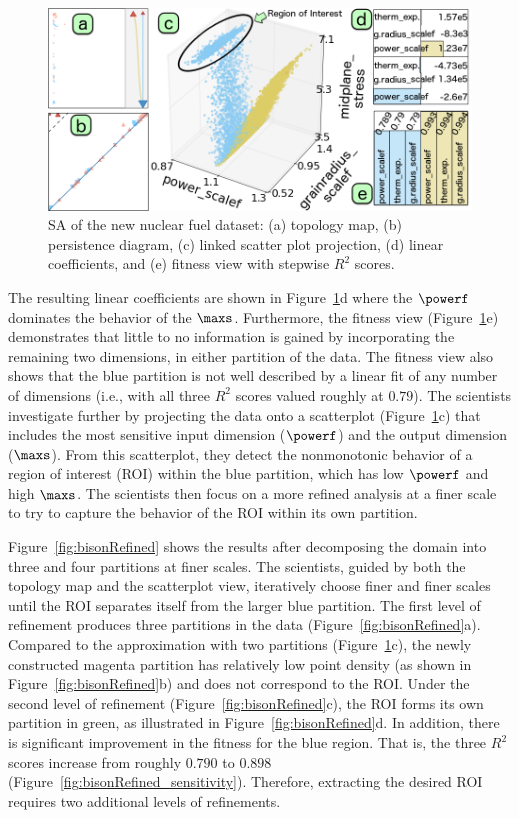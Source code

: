 \begin{figure}[!h]
  \centering
  \includegraphics[width=.48\textwidth]{figs/chap6/bison2}
  \caption{SA of the new nuclear fuel dataset:
  (a) topology map, (b) persistence diagram, (c) linked scatter plot projection,  (d) linear coefficients, and (e) fitness view with stepwise $R^2$ scores.
  }
  \label{fig:bison}
\end{figure}

The resulting linear coefficients are shown in Figure~\ref{fig:bison}d where the $\powerf$ dominates the behavior of the $\maxs$.
%
Furthermore, the fitness view (Figure~\ref{fig:bison}e) demonstrates that little to no information is gained by incorporating the remaining two dimensions, in either partition of the data.
%
The fitness view also shows that the blue partition is not well described by a linear fit of any number of dimensions (i.e., with all three $R^2$ scores valued roughly at $0.79$).
%
The scientists investigate further by projecting the data onto a scatterplot (Figure~\ref{fig:bison}c) that includes the most sensitive input dimension ($\powerf$) and the output dimension ($\maxs$).
%
From this scatterplot, they detect the nonmonotonic behavior of a region of interest (ROI) within the blue partition, which has low $\powerf$ and high $\maxs$.
%
The scientists then focus on a more refined analysis at a finer scale to try to capture the behavior of the ROI within its own partition.

Figure~\ref{fig:bisonRefined} shows the results after decomposing the domain into three and four partitions at finer scales.
%
The scientists, guided by both the topology map and the scatterplot view, iteratively choose finer and finer scales until the ROI separates itself from the larger blue partition.
%
The first level of refinement produces three partitions in the data (Figure~\ref{fig:bisonRefined}a).
%
Compared to the approximation with two partitions (Figure~\ref{fig:bison}c), the newly constructed magenta partition has relatively low point density (as shown in Figure~\ref{fig:bisonRefined}b) and does not correspond to the ROI.
%
Under the second level of refinement (Figure~\ref{fig:bisonRefined}c), the ROI forms its own partition in green, as illustrated in Figure~\ref{fig:bisonRefined}d.
%
In addition, there is significant improvement in the fitness for the blue region.
%
That is, the three $R^2$ scores increase from roughly $0.790$ to $0.898$ (Figure~\ref{fig:bisonRefined_sensitivity}).
%
Therefore, extracting the desired ROI requires two additional levels of refinements.

